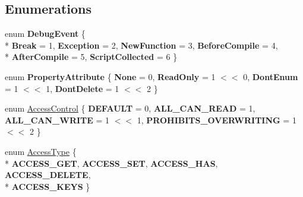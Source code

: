 \subsection*{Enumerations}
\begin{DoxyCompactItemize}
\item 
\hypertarget{namespacev8_a4157e857c3767e2b82686a53ae3da853}{}enum {\bfseries Debug\+Event} \{ \\*
{\bfseries Break} = 1, 
{\bfseries Exception} = 2, 
{\bfseries New\+Function} = 3, 
{\bfseries Before\+Compile} = 4, 
\\*
{\bfseries After\+Compile} = 5, 
{\bfseries Script\+Collected} = 6
 \}\label{namespacev8_a4157e857c3767e2b82686a53ae3da853}

\item 
\hypertarget{namespacev8_a05f25f935e108a1ea2d150e274602b87}{}enum {\bfseries Property\+Attribute} \{ {\bfseries None} = 0, 
{\bfseries Read\+Only} = 1 $<$$<$ 0, 
{\bfseries Dont\+Enum} = 1 $<$$<$ 1, 
{\bfseries Dont\+Delete} = 1 $<$$<$ 2
 \}\label{namespacev8_a05f25f935e108a1ea2d150e274602b87}

\item 
enum \hyperlink{namespacev8_a31d8355cb043d7d2dda3f4a52760b64e}{Access\+Control} \{ {\bfseries D\+E\+F\+A\+U\+L\+T} = 0, 
{\bfseries A\+L\+L\+\_\+\+C\+A\+N\+\_\+\+R\+E\+A\+D} = 1, 
{\bfseries A\+L\+L\+\_\+\+C\+A\+N\+\_\+\+W\+R\+I\+T\+E} = 1 $<$$<$ 1, 
{\bfseries P\+R\+O\+H\+I\+B\+I\+T\+S\+\_\+\+O\+V\+E\+R\+W\+R\+I\+T\+I\+N\+G} = 1 $<$$<$ 2
 \}
\item 
enum \hyperlink{namespacev8_add8bef6469c5b94706584124e610046c}{Access\+Type} \{ \\*
{\bfseries A\+C\+C\+E\+S\+S\+\_\+\+G\+E\+T}, 
{\bfseries A\+C\+C\+E\+S\+S\+\_\+\+S\+E\+T}, 
{\bfseries A\+C\+C\+E\+S\+S\+\_\+\+H\+A\+S}, 
{\bfseries A\+C\+C\+E\+S\+S\+\_\+\+D\+E\+L\+E\+T\+E}, 
\\*
{\bfseries A\+C\+C\+E\+S\+S\+\_\+\+K\+E\+Y\+S}
 \}
\end{DoxyCompactItemize}
